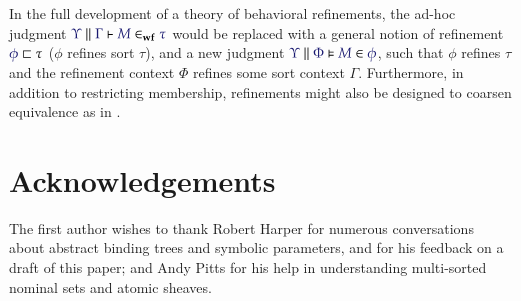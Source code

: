 \begin{remark}
  In the full development of a theory of behavioral refinements, the ad-hoc
  judgment $\IsWf{\Upsilon}{\Gamma}{M}{\tau}$ would be replaced with a general
  notion of refinement $\IMode{\phi}\sqsubset\tau$ ($\phi$ refines sort
  $\tau$), and a new judgment $\IMode{\Upsilon}\parallel\IMode{\Phi}\vDash
  \IMode{M} \in \IMode{\phi}$, such that $\phi$ refines $\tau$ and the
  refinement context $\Phi$ refines some sort context $\Gamma$. Furthermore, in
  addition to restricting membership, refinements might also be designed to
  coarsen equivalence as in \cite{denney:1998}.
\end{remark}

\section*{Acknowledgements}

The first author wishes to thank Robert Harper for numerous conversations about
abstract binding trees and symbolic parameters, and for his feedback on a draft
of this paper; and Andy Pitts for his help in understanding multi-sorted
nominal sets and atomic sheaves.
